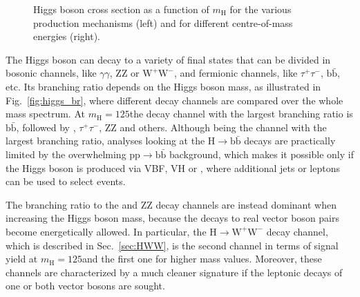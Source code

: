 \begin{figure}[htb]
\centering
{}
\caption{Higgs boson cross section as a function of $m_\mathrm{H}$ for the various production mechanisms (left) and for different centre-of-mass energies (right).}\label{fig:higgs_xsec}
\end{figure}

The Higgs boson can decay to a variety of final states that can be divided in bosonic channels, like $\gamma\gamma$, ZZ or $\mathrm{W^+W^-}$, and fermionic channels, like $\tau^+ \tau^-$, $\mathrm{b\bar b}$, etc.
Its branching ratio depends on the Higgs boson mass, as illustrated in Fig.~\ref{fig:higgs_br}, where different decay channels are compared over the whole mass spectrum. At $m_\mathrm{H} = 125$\GeV the decay channel with the largest branching ratio is $\mathrm{b\bar b}$, followed by \WW, $\tau^+\tau^-$, ZZ and others. Although being the channel with the largest branching ratio, analyses looking at the H$\to \mathrm{b \bar b}$ decays are practically limited by the overwhelming $\mathrm{pp \to b\bar b}$ background, which makes it possible only if the Higgs boson is produced via VBF, VH or \ttH, where additional jets or leptons can be used to select events.

The branching ratio to the \WW and ZZ decay channels are instead dominant when increasing the Higgs boson mass, because the decays to real vector boson pairs become energetically allowed. In particular, the H$\to \mathrm{W^+W^-}$ decay channel, which is described in Sec.~\ref{sec:HWW}, is the second channel in terms of signal yield at $m_\mathrm{H} = 125$\GeV and the first one for higher mass values. Moreover, these channels are characterized by a much cleaner signature if the leptonic decays of one or both vector bosons are sought.

